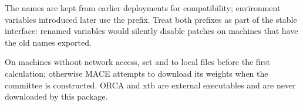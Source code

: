 \begin{notebox}
The  names are kept from earlier deployments for
compatibility; environment variables introduced later use the
 prefix.  Treat both prefixes as part of the stable
interface: renamed variables would silently disable patches on machines
that have the old names exported.
\end{notebox}

\begin{readbox}
On machines without network access, set  and
 to local  files before the first
calculation; otherwise MACE attempts to download its weights when the
committee is constructed.  ORCA and xtb are external executables and are
never downloaded by this package.
\end{readbox}
